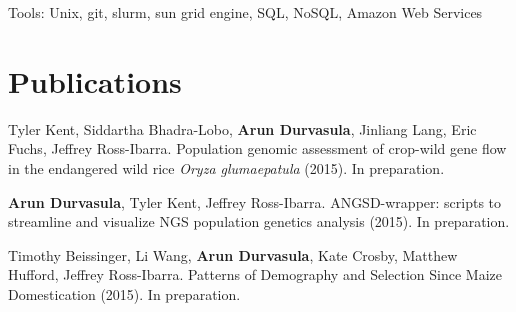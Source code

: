 \documentclass[letterpaper]{article}
\renewenvironment{itemize}{
  \begin{list}{}{
    \setlength{\leftmargin}{1em}
  }
}{
  \end{list}
}
\begin{document}
\begin{itemize}
\item Tools: Unix, git, slurm, sun grid engine, SQL, NoSQL, Amazon Web Services
\end{itemize}

\section*{Publications}
\begin{itemize}
\item Tyler Kent, Siddartha Bhadra-Lobo, {\bf Arun Durvasula}, Jinliang Lang, Eric Fuchs, Jeffrey Ross-Ibarra. Population genomic assessment of crop-wild gene flow in the endangered wild rice \emph{Oryza glumaepatula} (2015). In preparation.
\item {\bf Arun Durvasula}, Tyler Kent, Jeffrey Ross-Ibarra. ANGSD-wrapper: scripts to streamline and visualize NGS population genetics analysis (2015). In preparation. %
\item Timothy Beissinger, Li Wang,  {\bf Arun Durvasula}, Kate Crosby, Matthew Hufford, Jeffrey Ross-Ibarra. Patterns of Demography and Selection Since Maize Domestication (2015). In preparation.
\end{itemize}
\end{document}
